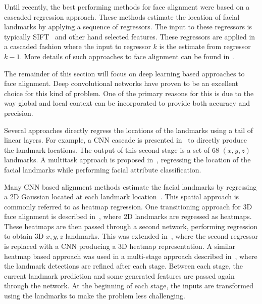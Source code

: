 
Until recently, the best performing methods for face alignment were
based on a cascaded regression approach. These methods estimate the
location of facial landmarks by applying a sequence of regressors. The
input to these regressors is typically SIFT~\cite{lowe2004distinctive}
and other hand selected features. These regressors are applied in a
cascaded fashion where the input to regressor $k$ is the estimate from
regressor $k-1$. More details of such approaches to face alignment can
be found
in~\cite{dollar2010cascaded,sanchez16,cao2014facewarehouse,xiongsupervised,zhu2015face,tzimiropoulos2015project}.

The remainder of this section will focus on deep learning based
approaches to face alignment. Deep convolutional networks have proven
to be an excellent choice for this kind of problem. One of the primary
reasons for this is due to the way global and local context can be
incorporated to provide both accuracy and precision.


Several approaches directly regress the locations of the landmarks
using a tail of linear layers. For example, a CNN cascade is presented
in~\cite{sun2013deep} to directly produce the landmark locations. The
output of this second stage is a set of 68 $(x, y, z)$ landmarks. A
multitask approach is proposed in~\cite{zhang2014facial}, regressing
the location of the facial landmarks while performing facial attribute
classification.

Many CNN based alignment methods estimate the facial landmarks by
regressing a 2D Gaussian located at each landmark
location~\cite{bulat2016two,bulat2017far,mahpod2018facial,kowalski2017deep,merget2018robust}.
This spatial approach is commonly referred to as heatmap
regression. One transitioning approach for 3D face alignment is
described in~\cite{bulat2016two}, where 2D landmarks are regressed as
heatmaps. These heatmaps are then passed through a second network,
performing regression to obtain 3D $x,y,z$ landmarks. This was
extended in~\cite{bulat2017far}, where the second regressor is
replaced with a CNN producing a 3D heatmap representation. A similar
heatmap based approach was used in a multi-stage approach described
in~\cite{kowalski2017deep}, where the landmark detections are refined
after each stage. Between each stage, the current landmark prediction
and some generated features are passed again through the network. At
the beginning of each stage, the inputs are transformed using the
landmarks to make the problem less challenging.

